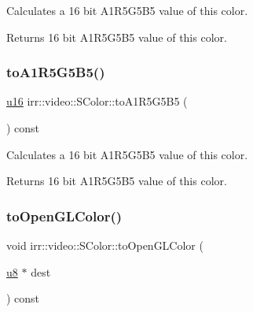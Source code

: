 Calculates a 16 bit A1\+R5\+G5\+B5 value of this color. 

\begin{DoxyReturn}{Returns}
16 bit A1\+R5\+G5\+B5 value of this color. 
\end{DoxyReturn}
\mbox{\label{classirr_1_1video_1_1SColor_aaa60619bb953ba3fd472b0193eda558e}} 
\subsubsection{\texorpdfstring{to\+A1\+R5\+G5\+B5()}{toA1R5G5B5()}\hspace{0.1cm}{\footnotesize\ttfamily [2/2]}}
{\footnotesize\ttfamily \hyperlink{namespaceirr_ae9f8ec82692ad3b83c21f555bfa70bcc}{u16} irr\+::video\+::\+S\+Color\+::to\+A1\+R5\+G5\+B5 (\begin{DoxyParamCaption}{ }\end{DoxyParamCaption}) const\hspace{0.3cm}{\ttfamily [inline]}}



Calculates a 16 bit A1\+R5\+G5\+B5 value of this color. 

\begin{DoxyReturn}{Returns}
16 bit A1\+R5\+G5\+B5 value of this color. 
\end{DoxyReturn}
\mbox{\label{classirr_1_1video_1_1SColor_a4251509c429bdc125660c59170b50a2e}} 
\subsubsection{\texorpdfstring{to\+Open\+G\+L\+Color()}{toOpenGLColor()}\hspace{0.1cm}{\footnotesize\ttfamily [1/2]}}
{\footnotesize\ttfamily void irr\+::video\+::\+S\+Color\+::to\+Open\+G\+L\+Color (\begin{DoxyParamCaption}\item[{\hyperlink{namespaceirr_a646874f69af8ff87fc10201b0254a761}{u8} $\ast$}]{dest }\end{DoxyParamCaption}) const\hspace{0.3cm}{\ttfamily [inline]}}



